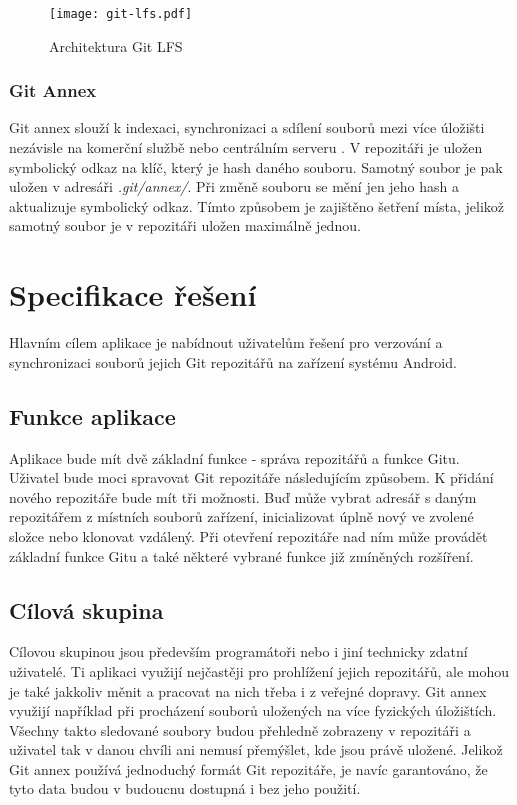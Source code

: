 \begin{figure}[h!]
    \centering
    \vspace{0.5cm}
    \texttt{[image: git-lfs.pdf]}
    \caption{Architektura Git LFS}
    \label{diagram:git-lfs}
\end{figure}

\subsection{Git Annex}
Git annex slouží k indexaci, synchronizaci a sdílení souborů mezi více úložišti nezávisle na komerční službě nebo centrálním serveru \cite{wiki-git-annex}. V repozitáři je uložen symbolický odkaz na klíč, který je hash daného souboru. Samotný soubor je pak uložen v adresáři \emph{.git/annex/}. Při změně souboru se mění jen jeho hash a aktualizuje symbolický odkaz. Tímto způsobem je zajištěno šetření místa, jelikož samotný soubor je v repozitáři uložen maximálně jednou.

\chapter{Specifikace řešení}
Hlavním cílem aplikace je nabídnout uživatelům řešení pro verzování a synchronizaci souborů jejich Git repozitářů na zařízení systému Android.

\section{Funkce aplikace}
Aplikace bude mít dvě základní funkce - správa repozitářů a funkce Gitu. Uživatel bude moci spravovat Git repozitáře následujícím způsobem. K přidání nového repozitáře bude mít tři možnosti. Buď může vybrat adresář s daným repozitářem z místních souborů zařízení, inicializovat úplně nový ve zvolené složce nebo klonovat vzdálený. Při otevření repozitáře nad ním může provádět základní funkce Gitu a také některé vybrané funkce již zmíněných rozšíření.

\section{Cílová skupina}
Cílovou skupinou jsou především programátoři nebo i jiní technicky zdatní uživatelé. Ti aplikaci využijí nejčastěji pro prohlížení jejich repozitářů, ale mohou je také jakkoliv měnit a pracovat na nich třeba i z veřejné dopravy. Git annex využijí například při procházení souborů uložených na více fyzických úložištích. Všechny takto sledované soubory budou přehledně zobrazeny v repozitáři a uživatel tak v danou chvíli ani nemusí přemýšlet, kde jsou právě uložené. Jelikož Git annex používá jednoduchý formát Git repozitáře, je navíc garantováno, že tyto data budou v budoucnu dostupná i bez jeho použití.

